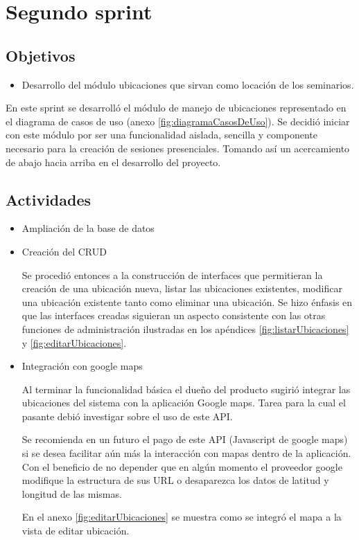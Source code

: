 \section{Segundo sprint} %
\label{sec:segundo_sprint}

\subsection{Objetivos}

\begin{itemize}
	\item Desarrollo del módulo ubicaciones que sirvan como locación de los seminarios.
\end{itemize}

En este sprint se desarrolló el módulo de manejo de ubicaciones representado en el diagrama de casos de uso (anexo \ref{fig:diagramaCasosDeUso}). Se decidió iniciar con este módulo por ser una funcionalidad aislada, sencilla y componente necesario para la creación de sesiones presenciales. Tomando así un acercamiento de abajo hacia arriba en el desarrollo del proyecto.

\subsection{Actividades} %
\label{sub:actividades2}

\begin{itemize}

\item Ampliación de la base de datos

\item Creación del CRUD


Se procedió entonces a la construcción de interfaces que permitieran la creación de una ubicación nueva, listar las ubicaciones existentes, modificar una ubicación existente tanto como eliminar una ubicación. Se hizo énfasis en que las interfaces creadas siguieran un aspecto consistente con las otras funciones de administración ilustradas en los apéndices \ref{fig:listarUbicaciones} y \ref{fig:editarUbicaciones}.

\item Integración con google maps

Al terminar la funcionalidad básica el dueño del producto sugirió integrar las ubicaciones del sistema con la aplicación Google maps. Tarea para la cual el pasante debió investigar sobre el uso de este API. 

Se recomienda en un futuro el pago de este API (Javascript de google maps) si se desea facilitar aún más la interacción con mapas dentro de la aplicación. Con el beneficio de no depender que en algún momento el proveedor google modifique la estructura de sus URL o desaparezca los datos de latitud y longitud de las mismas.

En el anexo \ref{fig:editarUbicaciones} se muestra como se integró el mapa a la vista de editar ubicación.

\end{itemize}





